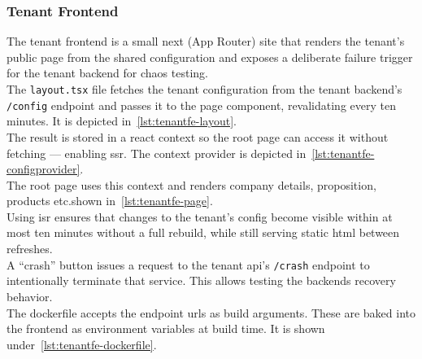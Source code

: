 \documentclass[11pt, a4paper, oneside, listof=totoc]{scrartcl}
\begin{document}
            \subsubsection{Tenant Frontend}\label{subsubsec:tenantFrontend}
                The tenant frontend is a small \gls{next} (App Router) site that renders the tenant's
                public page from the shared configuration and exposes a deliberate failure trigger
                for the tenant backend for chaos testing.\\
                The \texttt{layout.tsx} file fetches the tenant configuration from the tenant
                backend's \texttt{/config} endpoint and passes it to the page component,
                revalidating every ten minutes. 
                It is depicted in~\autoref{lst:tenantfe-layout}.\\
                The result is stored in a react context so the root page can access it without
                fetching --- enabling \gls{ssr}.
                The context provider is depicted in~\autoref{lst:tenantfe-configprovider}.\\
                The root page uses this context and renders company details, proposition,
                products etc.\@as shown in~\autoref{lst:tenantfe-page}.\\
                Using \gls{isr} ensures that changes to the tenant's config become visible within
                at most ten minutes without a full rebuild, while still serving static \gls{html}
                between refreshes.\\
                A \enquote{crash} button issues a request to the tenant \gls{api}'s \texttt{/crash}
                endpoint to intentionally terminate that service.
                This allows testing the backends recovery behavior.\\
                The dockerfile accepts the endpoint \glspl{url} as build arguments.
                These are baked into the frontend as environment variables at build time.
                It is shown under~\autoref{lst:tenantfe-dockerfile}.
\end{document}
